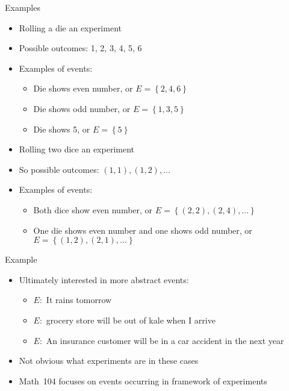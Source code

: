 \documentclass[handout]{beamer}
\theoremstyle{definition}
\begin{document}
\begin{frame}{Examples}
\begin{example}
\begin{itemize}
\item Rolling a die an experiment
\item Possible outcomes: 1, 2, 3, 4, 5, 6
\item Examples of events:
\begin{itemize}
\item Die shows even number, or $E=\left\{2,4,6\right\}$
\item Die shows odd number, or $E=\left\{1,3,5\right\}$
\item Die shows 5, or $E=\left\{5\right\}$
\end{itemize}
\end{itemize}
\end{example}
\begin{example}
\begin{itemize}
\item Rolling \alert{two} dice an experiment
\item So possible outcomes: $\left(1,1\right),\left(1,2\right),\ldots$
\item Examples of events:
\begin{itemize}
\item Both dice show even number, or $E=\left\{\left(2,2\right),
\left(2,4\right),\ldots\right\}$
\item One die shows even number and one shows odd number,
or $E=\left\{\left(1,2\right),\left(2,1\right),\ldots\right\}$
\end{itemize}
\end{itemize}
\end{example}
\end{frame}

\begin{frame}{Example}
\begin{itemize}
\item Ultimately interested in more abstract events:
\begin{itemize}
\item $E:$ It rains tomorrow
\item $E:$ grocery store will be out of kale when I arrive
\item $E:$ An insurance customer will be in a car accident in the next year
\end{itemize}
\item Not obvious what experiments are in these cases
\item Math~104 focuses on events occurring in framework of experiments
\end{itemize}
\end{frame}
\end{document}
